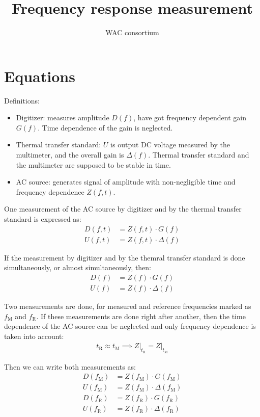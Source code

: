 \documentclass[a4paper, 12pt]{article}
\title{Frequency response measurement}
\author{WAC consortium}
\begin{document}
\maketitle

\section*{Equations}
Definitions:
\begin{itemize}
	\item Digitizer: measures amplitude $D(f)$, have got frequency dependent gain $G(f)$. Time dependence of the gain is neglected.
	\item Thermal transfer standard: $U$ is output DC voltage measured by the multimeter, and the overall gain is $\Delta(f)$. Thermal transfer standard and the multimeter are supposed to be stable in time.
	\item AC source: generates signal of amplitude with non-negligible time and frequency dependence $Z(f,t)$.
\end{itemize}

One measurement of the AC source by digitizer and by the thermal transfer
standard is expressed as:
\begin{align}
	D(f, t) & = Z(f, t) \cdot G(f)      \\
	U(f, t) & = Z(f, t) \cdot \Delta(f)
\end{align}

If the measurement by digitizer and by the themral transfer standard is done simultaneously, or almost simultaneously, then:
\begin{align}
	D(f) & = Z(f) \cdot G(f)      \\
	U(f) & = Z(f) \cdot \Delta(f)
\end{align}


Two measurements are done, for measured and reference frequencies marked as
$f_\text{M}$ and $f_\text{R}$. If these measurements are done right after
another, then the time dependence of the AC source can be neglected and only
frequency dependence is taken into account:
\begin{align}
	t_\text{R} \approx t_\text{M} \implies Z\big|_{t_\text{R}} = Z\big|_{t_\text{M}}
\end{align}

Then we can write both measurements as:
\begin{align}
	D(f_\text{M}) & = Z(f_\text{M}) \cdot      G(f_\text{M}) \\
	U(f_\text{M}) & = Z(f_\text{M}) \cdot \Delta(f_\text{M}) \\
	D(f_\text{R}) & = Z(f_\text{R}) \cdot      G(f_\text{R}) \\
	U(f_\text{R}) & = Z(f_\text{R}) \cdot \Delta(f_\text{R})
\end{align}
\end{document}
